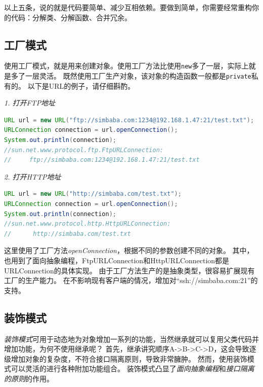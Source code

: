 \noindent
以上五条，说的就是代码要简单、减少互相依赖。要做到简单，你需要经常重构你的代码：分解类、分解函数、合并冗余。

\subsection{工厂模式}
使用工厂模式，就是用来创建对象。使用工厂方法比使用\lstinline{new}多了一层，实际上就是多了一层灵活。
既然使用工厂生产对象，该对象的构造函数一般都是\lstinline{private}私有的。
以下是URL的例子，请仔细斟酌。

\noindent \emph{1. 打开FTP地址}
\begin{lstlisting}[language=Java,mathescape]
URL url = new URL("ftp://simbaba.com:1234@192.168.1.47:21/test.txt");
URLConnection connection = url.openConnection();
System.out.println(connection);
//sun.net.www.protocol.ftp.FtpURLConnection:
//     ftp://simbaba.com:1234@192.168.1.47:21/test.txt
\end{lstlisting}

\noindent \emph{2. 打开HTTP地址}
\begin{lstlisting}[language=Java,mathescape]
URL url = new URL("http://simbaba.com/test.txt");
URLConnection connection = url.openConnection();
System.out.println(connection);
//sun.net.www.protocol.http.HttpURLConnection:
//      http://simbaba.com/test.txt
\end{lstlisting}
\noindent
这里使用了工厂方法\emph{openConnection}，根据不同的参数创建不同的对象。
其中，也用到了面向抽象编程，FtpURLConnection和HttpURLConnection都是URLConnection的具体实现。
由于工厂方法生产的是抽象类型，很容易扩展现有工厂的生产能力。
在不影响现有客户端的情况，增加对“ssh://simbaba.com:21”的支持。


\subsection{装饰模式}
\emph{装饰模式}可用于动态地为对象增加一系列的功能，当然继承就可以复用父类代码并增加功能，为何不使用继承呢？
首先，继承讲究顺序A->B->C->D，这会导致逐级增加对象的复杂度，不符合接口隔离原则，导致非常臃肿。
然而，使用装饰模式可以灵活的进行各种附加功能组合。
装饰模式凸显了\emph{面向抽象编程}和\emph{接口隔离的原则}的作用。



